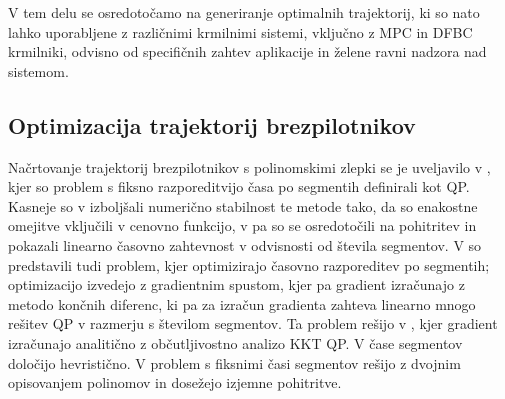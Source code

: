 \documentclass[mat2, tisk]{fmfdelo}
\begin{document}
V tem delu se osredotočamo na generiranje optimalnih trajektorij, ki so nato lahko uporabljene z različnimi krmilnimi sistemi, vključno z \ac{MPC} in \ac{DFBC} krmilniki, odvisno od specifičnih zahtev aplikacije in želene ravni nadzora nad sistemom.

\subsection{Optimizacija trajektorij brezpilotnikov}
Načrtovanje trajektorij brezpilotnikov s polinomskimi zlepki se je uveljavilo v \cite{mellinger2011minimum}, kjer so problem s fiksno razporeditvijo časa po segmentih definirali kot \ac{QP}. Kasneje so v \cite{richter2016polynomial} izboljšali numerično stabilnost te metode tako, da so enakostne omejitve vključili v cenovno funkcijo, v \cite{burke2020generating} pa so se osredotočili na pohitritev in pokazali linearno časovno zahtevnost v odvisnosti od števila segmentov. V \cite{mellinger2011minimum} so predstavili tudi problem, kjer optimizirajo časovno razporeditev po segmentih; optimizacijo izvedejo z gradientnim spustom, kjer pa gradient izračunajo z metodo končnih diferenc, ki pa za izračun gradienta zahteva linearno mnogo rešitev \ac{QP} v razmerju s številom segmentov. Ta problem rešijo v \cite{sun2021fast}, kjer gradient izračunajo analitično z občutljivostno analizo \ac{KKT} \ac{QP}. V \cite{gao2018online} čase segmentov določijo hevristično. V \cite{wang2021generating} problem s fiksnimi časi segmentov rešijo z dvojnim opisovanjem polinomov in dosežejo izjemne pohitritve.
\end{document}
